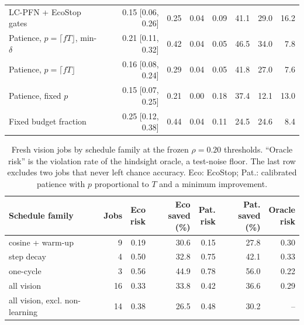 \documentclass[3p,twocolumn,10pt]{elsarticle}
\theoremstyle{definition}
\begin{document}
\begin{table}[t]
\begin{adjustbox}{max width=\textwidth}
\begin{tabular}{p{3.6cm}rrrrrrr}
LC-PFN + EcoStop gates & 0.15 [0.06, 0.26] & 0.25 & 0.04 & 0.09 & 41.1 & 29.0 & 16.2 \\
Patience, $p=\lceil fT\rfloor$, min-$\delta$ & 0.21 [0.11, 0.32] & 0.42 & 0.04 & 0.05 & 46.5 & 34.0 & 7.8 \\
Patience, $p=\lceil fT\rfloor$ & 0.16 [0.08, 0.24] & 0.29 & 0.04 & 0.05 & 41.8 & 27.0 & 7.6 \\
Patience, fixed $p$ & 0.15 [0.07, 0.25] & 0.21 & 0.00 & 0.18 & 37.4 & 12.1 & 13.0 \\
Fixed budget fraction & 0.25 [0.12, 0.38] & 0.44 & 0.04 & 0.11 & 24.5 & 24.6 & 8.4 \\
\bottomrule
\end{tabular}
\end{adjustbox}
\end{table}

\begin{table}[t]
\centering
\caption{Fresh vision jobs by schedule family at the frozen $\rho=0.20$ thresholds. ``Oracle risk'' is the violation rate of the hindsight oracle, a test-noise floor. The last row excludes two jobs that never left chance accuracy. Eco: EcoStop; Pat.: calibrated patience with $p$ proportional to $T$ and a minimum improvement.}
\label{tab:b1sched}
\footnotesize
\begin{adjustbox}{max width=\columnwidth}
\begin{tabular}{p{2.6cm}rrrrrr}
\toprule
Schedule family & Jobs & \shortstack{Eco\\risk} & \shortstack{Eco\\saved (\%)} & \shortstack{Pat.\\risk} & \shortstack{Pat.\\saved (\%)} & \shortstack{Oracle\\risk} \\
\midrule
cosine + warm-up & 9 & 0.19 & 30.6 & 0.15 & 27.8 & 0.30 \\
step decay & 4 & 0.50 & 32.8 & 0.75 & 42.1 & 0.33 \\
one-cycle & 3 & 0.56 & 44.9 & 0.78 & 56.0 & 0.22 \\
all vision & 16 & 0.33 & 33.8 & 0.42 & 36.6 & 0.29 \\
all vision, excl. non-learning & 14 & 0.38 & 26.5 & 0.48 & 30.2 & -- \\
\bottomrule
\end{tabular}
\end{adjustbox}
\end{table}
\end{document}
